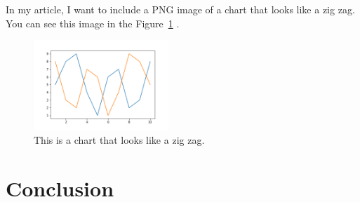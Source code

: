 \documentclass{proc}
\begin{document}
  In my article, I want to include a PNG image of a chart that looks like a zig zag. You can see this image in the Figure~\ref{fig:chart} .
  \begin{figure}[htbp]
    \begin{center}
				\includegraphics[width=2in]{chart.png}
        \caption{This is a chart that looks like a zig zag.}
        \label{fig:chart}
    \end{center}
  \end{figure}

     

\section{Conclusion}
  
\end{document}
